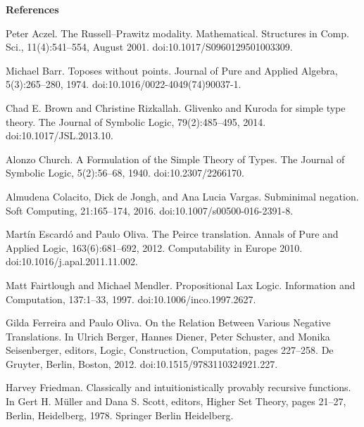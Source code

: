 
 
\par\medskip\noindent\textbf{References}\par
  
\par\noindent  [1]  Peter Aczel.  The Russell–Prawitz modality.  Mathematical. Structures in Comp. Sci., 11(4):541–554, August 2001.  doi:10.1017/S0960129501003309.  
 
\par\noindent  [2]  Michael Barr.  Toposes without points.  Journal of Pure and Applied Algebra, 5(3):265–280, 1974.  doi:10.1016/0022-4049(74)90037-1.  
 
\par\noindent  [3]  Chad E. Brown and Christine Rizkallah.  Glivenko and Kuroda for simple type theory.  The Journal of Symbolic Logic, 79(2):485–495, 2014.  doi:10.1017/JSL.2013.10.  
 
\par\noindent  [4]  Alonzo Church.  A Formulation of the Simple Theory of Types.  The Journal of Symbolic Logic, 5(2):56–68, 1940.  doi:10.2307/2266170.  
 
\par\noindent  [5]  Almudena Colacito, Dick de Jongh, and Ana Lucia Vargas.  Subminimal negation.  Soft Computing, 21:165–174, 2016.  doi:10.1007/s00500-016-2391-8.  
 
\par\noindent  [6]  Martín Escardó and Paulo Oliva.  The Peirce translation.  Annals of Pure and Applied Logic, 163(6):681–692, 2012.  Computability in Europe 2010.  doi:10.1016/j.apal.2011.11.002.  
 
\par\noindent  [7]  Matt Fairtlough and Michael Mendler.  Propositional Lax Logic.  Information and Computation, 137:1–33, 1997.  doi:10.1006/inco.1997.2627.  
 
\par\noindent  [8]  Gilda Ferreira and Paulo Oliva.  On the Relation Between Various Negative Translations.  In Ulrich Berger, Hannes Diener, Peter Schuster, and Monika Seisenberger, editors, Logic, Construction, Computation, pages 227–258. De Gruyter, Berlin, Boston, 2012.  doi:10.1515/9783110324921.227.  
 
\par\noindent  [9]  Harvey Friedman.  Classically and intuitionistically provably recursive functions.  In Gert H. Müller and Dana S. Scott, editors, Higher Set Theory, pages 21–27, Berlin, Heidelberg, 1978. Springer Berlin Heidelberg.  
 

